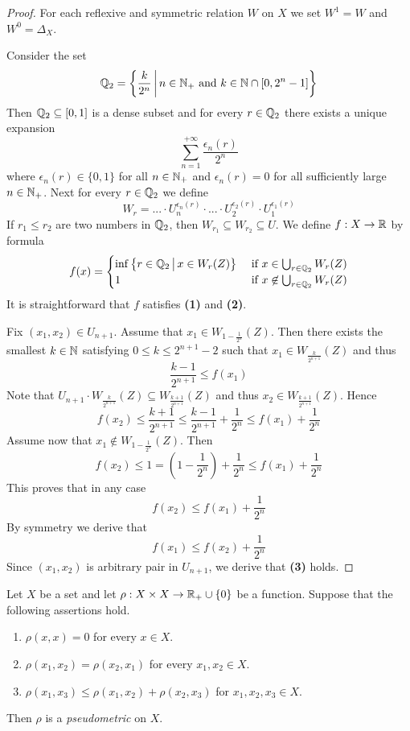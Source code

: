 \begin{proof}
	For each reflexive and symmetric relation $W$ on $X$ we set $W^{1} = W$ and $W^0 = \Delta_X$.

	Consider the set
	$${\mathbb Q}_2 = \bigg\{\frac{k}{2^n}\,\bigg|\,n\in {\mathbb N}_+\mbox{ and }k\in {\mathbb N}\cap [0,2^{n} - 1]\bigg\}$$
	Then ${\mathbb Q}_2 \subseteq [0,1]$ is a dense subset and for every $r \in {\mathbb Q}_2$ there exists a unique expansion
	$$\sum_{n=1}^{+\infty}\frac{\epsilon_n(r)}{2^n}$$
	where $\epsilon_n(r) \in \{0,1\}$ for all $n\in {\mathbb N}_+$ and $\epsilon_n(r) = 0$ for all sufficiently large $n \in {\mathbb N}_+$. Next for every $r \in {\mathbb Q}_2$ we define
	$$W_r = ... \cdot U_n^{\epsilon_n(r)}\cdot ...\cdot U_2^{\epsilon_2(r)}\cdot U_1^{\epsilon_1(r)}$$
	If $r_1 \leq r_2$ are two numbers in ${\mathbb Q}_2$, then $W_{r_1}\subseteq W_{r_2} \subseteq U$. We define $f:X\rightarrow {\mathbb R}$ by formula
	$$f(x) = \begin{cases}
			\inf \big\{r\in {\mathbb Q}_2\,\big|\,x\in W_r(Z)\big\} & \mbox{ if }x \in \bigcup_{r\in {\mathbb Q}_2}W_r(Z)      \\
			1                                               & \mbox{ if }x\not \in \bigcup_{r \in {\mathbb Q}_2}W_r(Z) \\
		\end{cases}
	$$
	It is straightforward that $f$ satisfies \textbf{(1)} and \textbf{(2)}.

	Fix $(x_1,x_2) \in U_{n+1}$. Assume that $x_1 \in W_{1 - \frac{1}{2^{n}}}(Z)$. Then there exists the smallest $k \in {\mathbb N}$ satisfying $0 \leq k \leq 2^{n+1} -2$ such that $x_1 \in W_{\frac{k}{2^{n+1}}}(Z)$ and thus
	$$\frac{k - 1}{2^{n+1}} \leq f(x_1)$$
	Note that $U_{n+1}\cdot W_{\frac{k}{2^{n+1}}}(Z) \subseteq W_{\frac{k + 1}{2^{n+1}}}(Z)$ and thus $x_2 \in W_{\frac{k + 1}{2^{n + 1}}}(Z)$. Hence
	$$f(x_2) \leq \frac{k + 1}{2^{n+1}} \leq \frac{k - 1}{2^{n+1}} + \frac{1}{2^{n}}\leq f(x_1) + \frac{1}{2^n}$$
	Assume now that $x_1 \not \in W_{1 - \frac{1}{2^{n}}}(Z)$. Then
	$$f(x_2) \leq 1 = \left(1 - \frac{1}{2^n}\right) + \frac{1}{2^{n}} \leq f(x_1) + \frac{1}{2^n}$$
	This proves that in any case
	$$f(x_2) \leq f(x_1) + \frac{1}{2^n}$$
	By symmetry we derive that
	$$f(x_1) \leq f(x_2) + \frac{1}{2^n}$$
	Since $(x_1, x_2)$ is arbitrary pair in $U_{n + 1}$, we derive that \textbf{(3)} holds.
\end{proof}

\begin{definition}
	Let $X$ be a set and let $\rho:X\times X \rightarrow {\mathbb R}_+\cup \{0\}$ be a function. Suppose that the following assertions hold.
	\begin{enumerate}[label=\textbf{(\arabic*)}, leftmargin=3.0em]
		\item $\rho(x, x) = 0$ for every $x \in X$.
		\item $\rho(x_1, x_2) = \rho(x_2, x_1)$ for every $x_1,x_2 \in X$.
		\item $\rho(x_1, x_3) \leq \rho(x_1, x_2) + \rho(x_2, x_3)$ for $x_1,x_2,x_3 \in X$.
	\end{enumerate}
	Then $\rho$ is a \textit{pseudometric} on $X$.
\end{definition}

